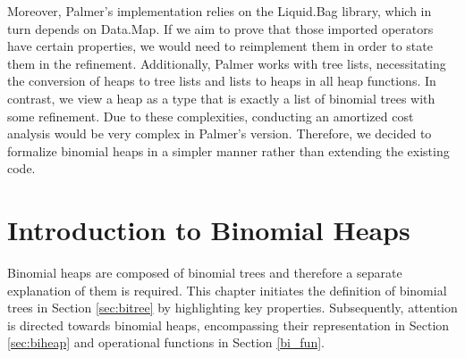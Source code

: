 \documentclass{clmthesis}
\begin{document}
Moreover, Palmer's implementation relies on the Liquid.Bag library, which in turn depends on Data.Map. If we aim to prove that those imported operators have certain properties, we would need to reimplement them in order to state them in the refinement. Additionally, Palmer works with tree lists, necessitating the conversion of heaps to tree lists and lists to heaps in all heap functions. In contrast, we view a heap as a type that is exactly a list of binomial trees with some refinement. Due to these complexities, conducting an amortized cost analysis would be very complex in Palmer's version. Therefore, we decided to formalize binomial heaps in a simpler manner rather than extending the existing code.




\chapter{Introduction to Binomial Heaps}\label{prel_binomial}
Binomial heaps are composed of binomial trees and therefore a separate explanation of them is required. This chapter initiates the definition of binomial trees in Section \ref{sec:bitree} by highlighting key properties. Subsequently, attention is directed towards binomial heaps, encompassing their representation in Section \ref{sec:biheap} and operational functions in Section \ref{bi_fun}.
\end{document}
